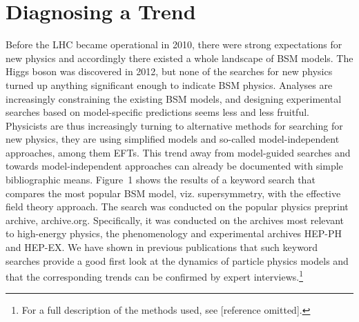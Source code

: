 \section{Diagnosing a Trend} \label{sec:data}
Before the LHC became operational in 2010, there were strong expectations for new physics and accordingly there existed a whole landscape of BSM models. 
The Higgs boson was discovered in 2012, but none of the searches for new physics turned up anything significant enough to indicate BSM physics.
Analyses are increasingly constraining the existing BSM models, and designing experimental searches based on model-specific predictions seems less and less fruitful. 
Physicists are thus increasingly turning to alternative methods for searching for new physics, they are using simplified models and so-called model-independent approaches, among them EFTs.
This trend away from model-guided searches and towards model-independent approaches can already be documented with simple bibliographic means.
Figure~1 shows the results of a keyword search that compares the most popular BSM model, viz. supersymmetry, with the effective field theory approach. 
The search was conducted on the popular physics preprint archive, archive.org.
Specifically, it was conducted on the archives most relevant to high-energy physics, the phenomenology and experimental archives HEP-PH and HEP-EX. 
We have shown in previous publications that such keyword searches provide a good first look at the dynamics of particle physics models and that the corresponding trends can be confirmed by expert interviews.\footnote{For a full description of the methods used, see [reference omitted].}

